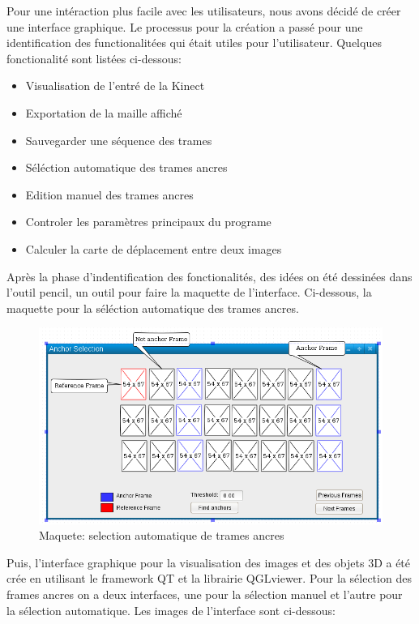 \documentclass[a4paper,12pt]{article}
\begin{document}
Pour une intéraction plus facile avec les utilisateurs, nous avons
décidé de créer une interface graphique. Le processus pour la création
a passé pour une identification des functionalitées qui était utiles
pour l'utilisateur. Quelques fonctionalité sont listées ci-dessous:

\begin{itemize}
\item Visualisation de l'entré de la Kinect 
\item Exportation de la maille affiché
\item Sauvegarder une séquence des trames
\item Séléction automatique des trames ancres
\item Edition manuel des trames ancres
\item Controler les paramètres principaux du programe
\item Calculer la carte de déplacement entre deux images
\end{itemize}

Après la phase d'indentification des fonctionalités, des idées on été
dessinées dans l'outil pencil\cite{Pencil}, un outil pour faire la
maquette de l'interface. 
Ci-dessous, la maquette pour la séléction automatique des trames ancres.

\begin{figure}[h!]
  \begin{center}
    \includegraphics[scale=0.4]{img/pencil.png}
    \caption{Maquete: selection automatique de trames ancres}
  \end{center}
\end{figure}


Puis, l'interface graphique pour la visualisation des images et des
objets 3D a été crée en utilisant le framework QT et la librairie
QGLviewer. 
Pour la sélection des  frames ancres on a deux interfaces, une pour la
sélection manuel et l’autre pour la sélection automatique. Les images
de l’interface sont ci-dessous:
\end{document}
